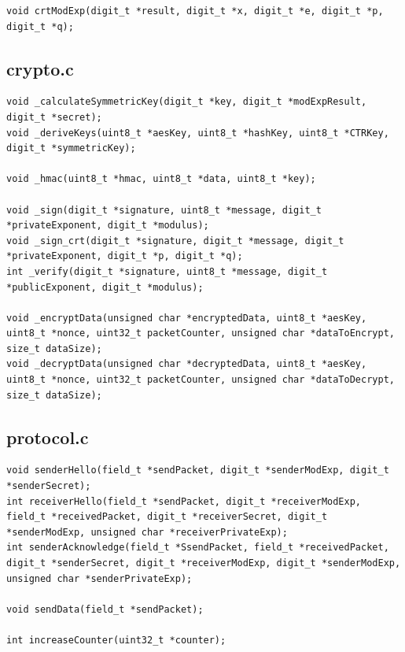 \documentclass[a4paper]{article}
\begin{document}
\begin{appendices}
\begin{lstlisting}[numbers=none, xleftmargin=0pt]
void crtModExp(digit_t *result, digit_t *x, digit_t *e, digit_t *p, digit_t *q);
\end{lstlisting}

\subsection{crypto.c}

\begin{lstlisting}[numbers=none, xleftmargin=0pt]
void _calculateSymmetricKey(digit_t *key, digit_t *modExpResult, digit_t *secret);
void _deriveKeys(uint8_t *aesKey, uint8_t *hashKey, uint8_t *CTRKey, digit_t *symmetricKey);

void _hmac(uint8_t *hmac, uint8_t *data, uint8_t *key);

void _sign(digit_t *signature, uint8_t *message, digit_t *privateExponent, digit_t *modulus);
void _sign_crt(digit_t *signature, digit_t *message, digit_t *privateExponent, digit_t *p, digit_t *q);
int _verify(digit_t *signature, uint8_t *message, digit_t *publicExponent, digit_t *modulus);

void _encryptData(unsigned char *encryptedData, uint8_t *aesKey, uint8_t *nonce, uint32_t packetCounter, unsigned char *dataToEncrypt, size_t dataSize);
void _decryptData(unsigned char *decryptedData, uint8_t *aesKey, uint8_t *nonce, uint32_t packetCounter, unsigned char *dataToDecrypt, size_t dataSize);
\end{lstlisting}

\subsection{protocol.c}

\begin{lstlisting}[numbers=none, xleftmargin=0pt]
void senderHello(field_t *sendPacket, digit_t *senderModExp, digit_t *senderSecret);
int receiverHello(field_t *sendPacket, digit_t *receiverModExp, field_t *receivedPacket, digit_t *receiverSecret, digit_t *senderModExp, unsigned char *receiverPrivateExp);
int senderAcknowledge(field_t *SsendPacket, field_t *receivedPacket, digit_t *senderSecret, digit_t *receiverModExp, digit_t *senderModExp, unsigned char *senderPrivateExp);

void sendData(field_t *sendPacket);

int increaseCounter(uint32_t *counter);
\end{lstlisting}


\end{appendices}
\end{document}
